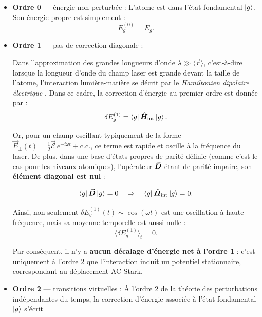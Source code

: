 \begin{itemize}[label = $\bullet$] 
\item \textbf{Ordre 0} — énergie non perturbée :  
L’atome est dans l’état fondamental \( \ket{g} \). Son énergie propre est simplement :  
\begin{equation}
E_g^{(0)} = E_g.
\end{equation}

\item \textbf{Ordre 1} — pas de correction diagonale :  

Dans l’approximation des grandes longueurs d’onde \( \lambda \gg \langle \vec{r} \rangle \), c’est-à-dire lorsque la longueur d’onde du champ laser est grande devant la taille de l’atome, l’interaction lumière-matière se décrit par le \emph{Hamiltonien dipolaire électrique} . Dans ce cadre, la correction d’énergie au premier ordre est donnée par :
\begin{equation}
\delta E_g^{(1)} = \bra{g} \hat{\bm{H}}_{\text{int}} \ket{g}.
\end{equation}

Or, pour un champ oscillant typiquement de la forme \( \vec{E}_{\perp}(t) = \frac{1}{2} \vec{\mathcal{E}}\, e^{-i\omega t} + \text{c.c.} \), ce terme est rapide et oscille à la fréquence du laser. De plus, dans une base d’états propres de parité définie (comme c’est le cas pour les niveaux atomiques), l’opérateur \( \vec{{\bm{D}}} \) étant de parité impaire, son \textbf{élément diagonal est nul} :

\begin{equation}
\bra{g}  \vec{{\bm{D}}} \ket{g} = 0 \quad \Rightarrow \quad \bra{g} \hat{\bm{H}}_{\text{int}} \ket{g} = 0.
\end{equation}

Ainsi, non seulement \( \delta E_g^{(1)}(t) \sim \cos(\omega t) \) est une oscillation à haute fréquence, mais sa moyenne temporelle est aussi nulle :
\begin{equation}
\langle \delta E_g^{(1)} \rangle_t = 0.
\end{equation}

Par conséquent, il n’y a \textbf{aucun décalage d’énergie net à l’ordre 1} : c’est uniquement à l’ordre 2 que l’interaction induit un potentiel stationnaire, correspondant au déplacement AC-Stark.


\item \textbf{Ordre 2} — transitions virtuelles :  
À l’ordre 2 de la théorie des perturbations indépendantes du temps, la correction d’énergie associée à l’état fondamental \(\ket{g}\) s’écrit


\end{itemize}
